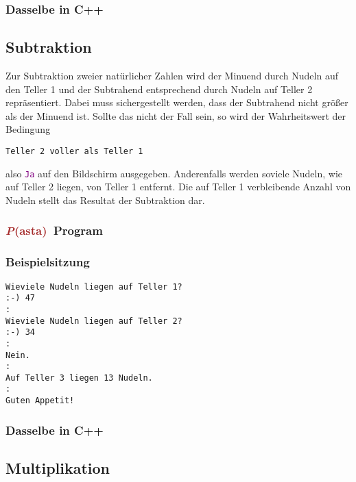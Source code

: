 \documentclass[11pt]{book}
\newcommand{\Pasta}{\textcolor{brown}{{\bf \em P}{\scriptsize{(asta)}}}}
\begin{document}
\subsubsection{Dasselbe in C++}


\subsection{Subtraktion}

Zur Subtraktion zweier nat\"urlicher Zahlen wird der Minuend
durch Nudeln auf den Teller 1 und der Subtrahend entsprechend durch 
Nudeln auf Teller 2 repr\"asentiert. Dabei muss sichergestellt werden,
dass der Subtrahend nicht gr\"o\ss er als der Minuend ist. Sollte das
nicht der Fall sein, so wird der Wahrheitswert der Bedingung
\color{blue}
\begin{lstlisting}
Teller 2 voller als Teller 1
\end{lstlisting}
\color{black}
also \textcolor{purple}{\lstinline{Ja}} auf den Bildschirm ausgegeben.
Anderenfalls werden soviele Nudeln, wie auf Teller 2 liegen, von Teller
1 entfernt. Die auf Teller 1 verbleibende Anzahl von Nudeln stellt
das Resultat der Subtraktion dar.

\subsubsection{\Pasta\ Program}
\color{blue}

\color{black}

\subsubsection{Beispielsitzung}
\color{purple}
\begin{lstlisting}
Wieviele Nudeln liegen auf Teller 1?
:-) 47
:
Wieviele Nudeln liegen auf Teller 2?
:-) 34
:
Nein.
:
Auf Teller 3 liegen 13 Nudeln.
:
Guten Appetit!
\end{lstlisting}
\color{black}

\subsubsection{Dasselbe in C++}



\subsection{Multiplikation}
\end{document}
